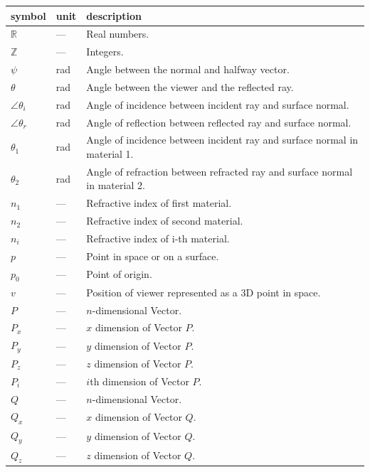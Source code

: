 \documentclass[12pt]{article}
\begin{document}
\noindent \begin{longtable*}{l l p{12cm}} \toprule
\textbf{symbol} & \textbf{unit} & \textbf{description}\\
\midrule 
$\mathbb{R}$ & --- & Real numbers.
\\
$\mathbb{Z}$ & --- & Integers.
\\
$\psi$ & \si[per-mode=symbol] {\radian} & Angle between the normal and halfway 
vector.
\\
$\theta$ & \si[per-mode=symbol] {\radian} & Angle between the viewer and the 
reflected ray.
\\
$\angle\theta_{i}$ & \si[per-mode=symbol] {\radian} & Angle of incidence 
between incident ray and surface normal.
\\
$\angle\theta_{r}$ & \si[per-mode=symbol] {\radian} & Angle of reflection 
between reflected ray and surface normal.
\\
$\theta_{1}$ & \si[per-mode=symbol] {\radian} & Angle of incidence 
between incident ray and surface normal in material 1.
\\
$\theta_{2}$ & \si[per-mode=symbol] {\radian} & Angle of refraction 
between refracted ray and surface normal in material 2.
\\
$n_{1}$ & --- & Refractive index of first material.
\\
$n_{2}$ & --- & Refractive index of second material.
\\
$n_{i}$ & --- & Refractive index of i-th material.
\\
$p$ & --- & Point in space or on a surface.
\\
$p_{0}$ & --- & Point of origin.
\\
$v$ & --- & Position of viewer represented as a 3D point in space.
\\
$P$ & --- & $n$-dimensional Vector.
\\
$P_{x}$ & --- & $x$ dimension of Vector $P$.
\\
$P_{y}$ & --- & $y$ dimension of Vector $P$.
\\
$P_{z}$ & --- & $z$ dimension of Vector $P$.
\\
$P_{i}$ & --- & $i$th dimension of Vector $P$.
\\
$Q$ & --- & $n$-dimensional Vector.
\\
$Q_{x}$ & --- & $x$ dimension of Vector $Q$.
\\
$Q_{y}$ & --- & $y$ dimension of Vector $Q$.
\\
$Q_{z}$ & --- & $z$ dimension of Vector $Q$.
\\

\end{longtable*}
\end{document}
